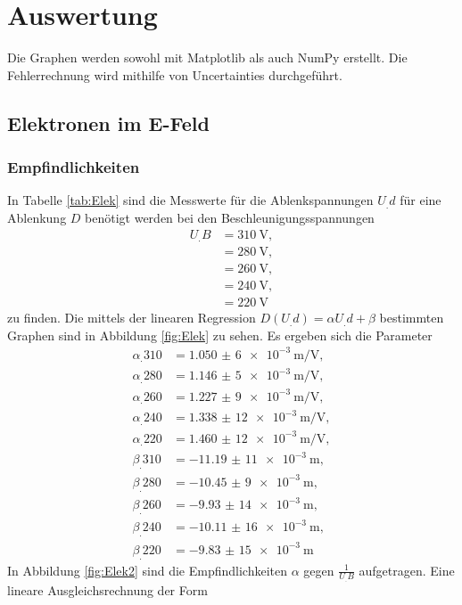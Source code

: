 \section{Auswertung}
\label{sec:Auswertung}


Die Graphen werden sowohl mit Matplotlib \cite{matplotlib} als auch NumPy \cite{numpy} erstellt. Die Fehlerrechnung wird mithilfe von Uncertainties \cite{uncertainties} durchgeführt.

\subsection{Elektronen im E-Feld}
\subsubsection{Empfindlichkeiten}
In Tabelle \ref{tab:Elek} sind die Messwerte für die Ablenkspannungen $U_.d$ für eine Ablenkung $D$ benötigt werden bei den Beschleunigungsspannungen
\begin{align*}
U_.B&=\SI{310}{\volt},\\
&=\SI{280}{\volt},\\
&=\SI{260}{\volt},\\
&=\SI{240}{\volt},\\
&=\SI{220}{\volt}
\end{align*}
zu finden. Die mittels der linearen Regression $D(U_.d)=\alpha U_.d + \beta$ bestimmten Graphen sind in Abbildung \ref{fig:Elek} zu sehen.
Es ergeben sich die Parameter
\begin{align*}
\alpha_.{310}&=\SI{1,050(6)e-3}{\metre\per\volt},\\
\alpha_.{280}&=\SI{1,146(5)e-3}{\metre\per\volt},\\
\alpha_.{260}&=\SI{1,227(9)e-3}{\metre\per\volt},\\
\alpha_.{240}&=\SI{1,338(12)e-3}{\metre\per\volt},\\
\alpha_.{220}&=\SI{1,460(12)e-3}{\metre\per\volt},\\
\beta_.{310}&=\SI{-11,19(11)e-3}{\metre},\\
\beta_.{280}&=\SI{-10,45(9)e-3}{\metre},\\
\beta_.{260}&=\SI{-9,93(14)e-3}{\metre},\\
\beta_.{240}&=\SI{-10,11(16)e-3}{\metre},\\
\beta_.{220}&=\SI{-9,83(15)e-3}{\metre}
\end{align*}
In Abbildung \ref{fig:Elek2} sind die Empfindlichkeiten $\alpha$ gegen $\frac{1}{U_.B}$ aufgetragen.
Eine lineare Ausgleichsrechnung der Form
